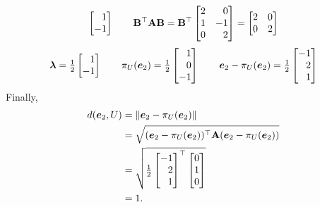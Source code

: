 \documentclass[11pt]{article}
\begin{document}
\begin{enumerate}
\[\begin{bmatrix*}[r]
                  1 \\ -1
              \end{bmatrix*}
              \qquad
              \mat{B}^\top \mat{A} \mat{B} =
              \mat{B}^\top
              \begin{bmatrix*}[r]
                  2 & 0  \\
                  1 & -1 \\
                  0 & 2  \\
              \end{bmatrix*}
              =
              \begin{bmatrix}
                  2 & 0 \\
                  0 & 2 \\
              \end{bmatrix}
          \]
          \[
              \vect{\lambda} =
              \tfrac{1}{2}
              \begin{bmatrix*}[r]
                  1 \\ -1
              \end{bmatrix*}
              \qquad
              \pi_U(\vect{e}_2) =
              \tfrac{1}{2}
              \begin{bmatrix*}[r]
                  1 \\ 0 \\ -1
              \end{bmatrix*}
              \qquad
              \vect{e}_2 - \pi_U(\vect{e}_2) =
              \tfrac{1}{2}
              \begin{bmatrix*}[r]
                  -1 \\ 2 \\ 1
              \end{bmatrix*}
          \]
          Finally,
          \[
              \begin{aligned}
                  d(\vect{e}_2, U) & = \norm{ \vect{e}_2 - \pi_U(\vect{e}_2) }                                                   \\
                                   & = \sqrt{( \vect{e}_2 - \pi_U(\vect{e}_2) )^\top \mat{A} ( \vect{e}_2 - \pi_U(\vect{e}_2) )} \\
                                   & = \sqrt{
                      \tfrac{1}{2}
                      \begin{bmatrix*}[r]
                          -1 \\ 2 \\ 1
                      \end{bmatrix*}^\top
                      \begin{bmatrix}
                          0 \\ 1 \\ 0
                      \end{bmatrix}
                  }
                  \\
                                   & = 1.
              \end{aligned}
          \]


\end{enumerate}
\end{document}
